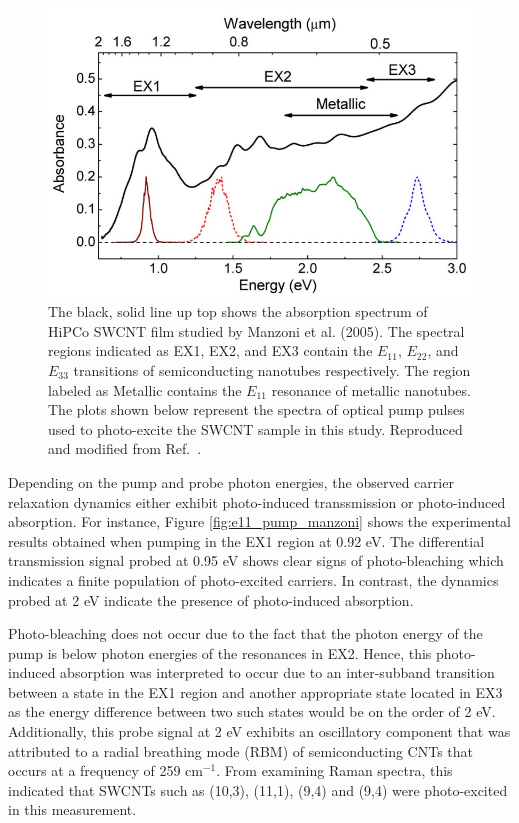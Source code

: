 \begin{figure}[ht]
	\centering
	\includegraphics[scale=0.4]{images/chapter_prior_works/abs_manzoni}
	\caption{The black, solid line up top shows the absorption spectrum of HiPCo SWCNT film studied by Manzoni et al. (2005). The spectral regions indicated as EX1, EX2, and EX3 contain the $E_{11}$, $E_{22}$, and $E_{33}$ transitions of semiconducting nanotubes respectively. The region labeled as Metallic contains the $E_{11}$ resonance of metallic nanotubes. The plots shown below represent the spectra of optical pump pulses used to photo-excite the SWCNT sample in this study. Reproduced and modified from Ref.\ \cite{manzoni2005intersubband}.}
	\label{fig:abs_manzoni}
\end{figure}

Depending on the pump and probe photon energies, the observed carrier relaxation dynamics either exhibit photo-induced transsmission or photo-induced absorption. For instance, Figure \ref{fig:e11_pump_manzoni} shows the experimental results obtained when pumping in the EX1 region at 0.92 eV. The differential transmission signal probed at 0.95 eV shows clear signs of photo-bleaching which indicates a finite population of photo-excited carriers. In contrast, the dynamics probed at 2 eV indicate the presence of photo-induced absorption.

Photo-bleaching does not occur due to the fact that the photon energy of the pump is below photon energies of the resonances in EX2. Hence, this photo-induced absorption was interpreted to occur due to an inter-subband transition between a state in the EX1 region and another appropriate state located in EX3 as the energy difference between two such states would be on the order of 2 eV. Additionally, this probe signal at 2 eV exhibits an oscillatory component that was attributed to a radial breathing mode (RBM) of semiconducting CNTs that occurs at a frequency of 259 $\text{cm}^{-1}$. From examining Raman spectra, this indicated that SWCNTs such as (10,3), (11,1), (9,4) and (9,4) were photo-excited in this measurement.


